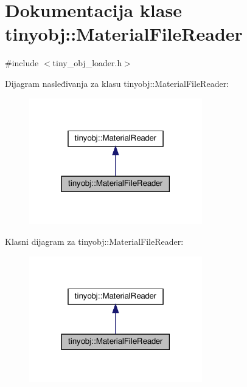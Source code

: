 \hypertarget{classtinyobj_1_1MaterialFileReader}{}\section{Dokumentacija klase tinyobj\+:\+:Material\+File\+Reader}
\label{classtinyobj_1_1MaterialFileReader}


{\ttfamily \#include $<$tiny\+\_\+obj\+\_\+loader.\+h$>$}



Dijagram nasleđivanja za klasu tinyobj\+:\+:Material\+File\+Reader\+:\nopagebreak
\begin{figure}[H]
\begin{center}
\leavevmode
\includegraphics[width=213pt]{classtinyobj_1_1MaterialFileReader__inherit__graph}
\end{center}
\end{figure}


Klasni dijagram za tinyobj\+:\+:Material\+File\+Reader\+:\nopagebreak
\begin{figure}[H]
\begin{center}
\leavevmode
\includegraphics[width=213pt]{classtinyobj_1_1MaterialFileReader__coll__graph}
\end{center}
\end{figure}
